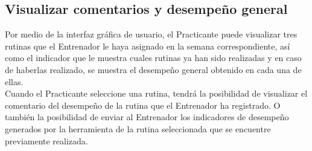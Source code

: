 \subsection{Visualizar comentarios y desempeño general}

Por medio de la interfaz gráfica de usuario, el Practicante puede visualizar tres rutinas que el Entrenador le haya asignado en la semana correspondiente, así como el indicador que le muestra cuales rutinas ya han sido realizadas y en caso de haberlas realizado, se muestra el desempeño general obtenido en cada una de ellas.\\

Cuando el Practicante seleccione una rutina, tendrá la posibilidad de visualizar el comentario del desempeño de la rutina que el Entrenador ha registrado. O también la posibilidad de enviar al Entrenador los indicadores de desempeño generados por la herramienta de la rutina seleccionada que se encuentre previamente realizada.\\


